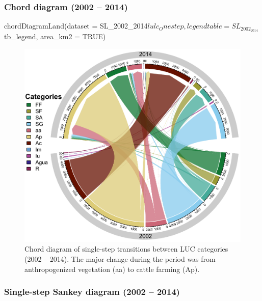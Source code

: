 \hypertarget{chord-diagram-2002-2014}{%
\subsubsection{Chord diagram (2002 -- 2014)}\label{chord-diagram-2002-2014}}

\begin{Schunk}
\begin{Sinput}
chordDiagramLand(dataset = SL_2002_2014$lulc_Onestep,
                 legendtable = SL_2002_2014$tb_legend,
                 area_km2 = TRUE)
\end{Sinput}
\begin{figure}[h]

{\centering \includegraphics[width=1\linewidth,trim={0 0cm 0 0cm},clip]{figures/chordDiagram.pdf} 

}

\caption[Chord Diagram 2002 - 2014]{Chord diagram of single-step transitions between LUC categories (2002 – 2014). The major change during the period was from anthropogenized vegetation (aa) to cattle farming (Ap).}\label{fig:chordDiagram}
\end{figure}
\end{Schunk}
\newpage
\hypertarget{single-step-sankey-diagram-2002-2014}{%
\subsubsection{Single-step Sankey diagram (2002 --
2014)}\label{single-step-sankey-diagram-2002-2014}}

